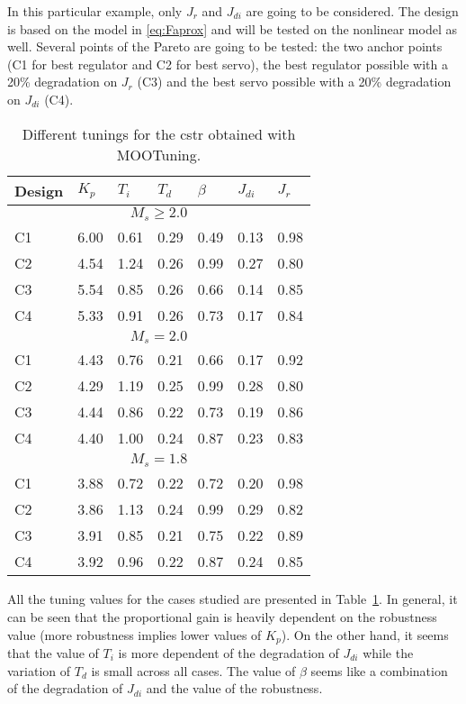 In this particular example, only $J_{r}$ and $J_{di}$ are going to be considered. The design is based on the model in \eqref{eq:Faprox} and will be tested on the nonlinear model as well. Several points of the Pareto are going to be tested: the two anchor points (C1 for best regulator and C2 for best servo), the best regulator possible with a 20\% degradation on $J_r$ (C3) and the best servo possible with a 20\% degradation on $J_{di}$ (C4).
%
\begin{table}[tb]
	\caption{Different tunings for the \gls{cstr} obtained with MOOTuning.}
	\centering
	\begin{tabular}{m{1cm}m{1cm}m{1cm}m{1cm}m{1cm}m{1cm}m{1cm}}
		\toprule
		Design & $K_p$ & $T_i$ & $T_d$ & $\beta$ & $J_{di}$ & $J_r$ \\
		\midrule
		\multicolumn{7}{c}{$M_s \geq 2.0$} \\
		\midrule
		C1 & 6.00 & 0.61 & 0.29 & 0.49 & 0.13 & 0.98\\
		C2 & 4.54 & 1.24 & 0.26 & 0.99 & 0.27 & 0.80\\
		C3 & 5.54 & 0.85 & 0.26 & 0.66 & 0.14 & 0.85\\
		C4 & 5.33 & 0.91 & 0.26 & 0.73 & 0.17 & 0.84\\
		\midrule
		\multicolumn{7}{c}{$M_s = 2.0$} \\
		\midrule
		C1 & 4.43 & 0.76 & 0.21 & 0.66 & 0.17 & 0.92\\
		C2 & 4.29 & 1.19 & 0.25 & 0.99 & 0.28 & 0.80\\
		C3 & 4.44 & 0.86 & 0.22 & 0.73 & 0.19 & 0.86\\
		C4 & 4.40 & 1.00 & 0.24 & 0.87 & 0.23 & 0.83\\
		\midrule
		\multicolumn{7}{c}{$M_s = 1.8$} \\
		\midrule
		C1 & 3.88 & 0.72 & 0.22 & 0.72 & 0.20 & 0.98\\
		C2 & 3.86 & 1.13 & 0.24 & 0.99 & 0.29 & 0.82\\
		C3 & 3.91 & 0.85 & 0.21 & 0.75 & 0.22 & 0.89\\
		C4 & 3.92 & 0.96 & 0.22 & 0.87 & 0.24 & 0.85\\
		\bottomrule
	\end{tabular}
	\label{tab:CSTRDesigns}
\end{table}

All the tuning values for the cases studied are presented in Table~\ref{tab:CSTRDesigns}. In general, it can be seen that the proportional gain is heavily dependent on the robustness value (more robustness implies lower values of $K_p$). On the other hand, it seems that the value of $T_i$ is more dependent of the degradation of $J_{di}$ while the variation of $T_d$ is small across all cases. The value of $\beta$ seems like a combination of the degradation of $J_{di}$ and the value of the robustness.

